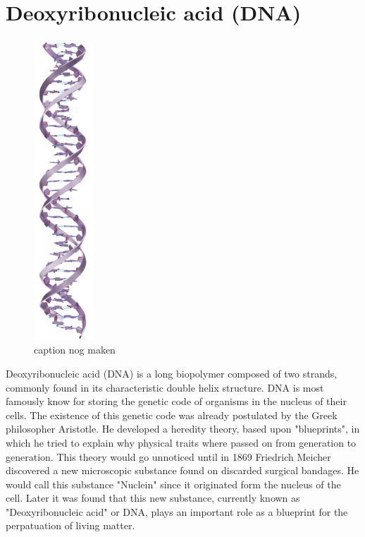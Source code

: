 \section{Deoxyribonucleic acid (DNA)}

\begin{figure}
  \begin{center}
    \includegraphics[width=0.20\textwidth]{Figures/cartoon2.png}
  \end{center}
  \caption{caption nog maken}
\end{figure}

Deoxyribonucleic acid (DNA) is a long biopolymer composed of two strands, commonly found
in its characteristic double helix structure. DNA is most famously know for storing the
genetic code of organisms in the nucleus of their cells. The existence of this genetic
code was already
postulated by the Greek philosopher Aristotle. He developed a heredity theory, based
upon "blueprints", in which he tried to explain why physical traits where passed on from
generation to generation. This theory would go unnoticed until in 1869
Friedrich Meicher discovered a new microscopic substance found on discarded
surgical bandages. He would call this substance "Nuclein" since it originated
form the nucleus of the cell. Later it was found that this new substance, currently known
as "Deoxyribonucleic acid" or DNA, plays an important role as a blueprint for the
perpatuation of living matter.

